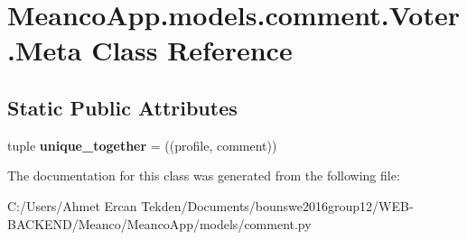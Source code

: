 \hypertarget{class_meanco_app_1_1models_1_1comment_1_1_voter_1_1_meta}{}\section{Meanco\+App.\+models.\+comment.\+Voter.\+Meta Class Reference}
\label{class_meanco_app_1_1models_1_1comment_1_1_voter_1_1_meta}
\subsection*{Static Public Attributes}
\begin{DoxyCompactItemize}
\item 
\hypertarget{class_meanco_app_1_1models_1_1comment_1_1_voter_1_1_meta_aa65c6ec6ca6d2ddc83181054d2b01e59}{}\label{class_meanco_app_1_1models_1_1comment_1_1_voter_1_1_meta_aa65c6ec6ca6d2ddc83181054d2b01e59} 
tuple {\bfseries unique\+\_\+together} = ((\textquotesingle{}profile\textquotesingle{}, \textquotesingle{}comment\textquotesingle{}))
\end{DoxyCompactItemize}


The documentation for this class was generated from the following file\+:\begin{DoxyCompactItemize}
\item 
C\+:/\+Users/\+Ahmet Ercan Tekden/\+Documents/bounswe2016group12/\+W\+E\+B-\/\+B\+A\+C\+K\+E\+N\+D/\+Meanco/\+Meanco\+App/models/comment.\+py\end{DoxyCompactItemize}
